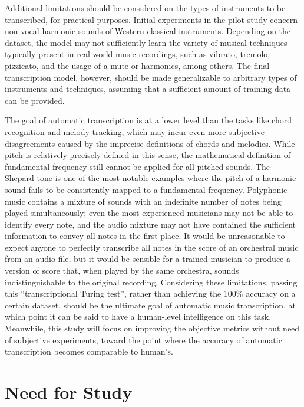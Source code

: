 Additional limitations should be considered on the types of instruments to be transcribed, for practical purposes.
Initial experiments in the pilot study concern non-vocal harmonic sounds of Western classical instruments.
Depending on the dataset, the model may not sufficiently learn the variety of musical techniques typically present in real-world music recordings, such as vibrato, tremolo, pizzicato, and the usage of a mute or harmonics, among others.
The final transcription model, however, should be made generalizable to arbitrary types of instruments and techniques, assuming that a sufficient amount of training data can be provided.


The goal of automatic transcription is at a lower level than the tasks like chord recognition and melody tracking, which may incur even more subjective disagreements caused by the imprecise definitions of chords and melodies.
While pitch is relatively precisely defined in this sense, the mathematical definition of fundamental frequency still cannot be applied for all pitched sounds.
The Shepard tone \cite{shepard1964circularity} is one of the most notable examples where the pitch of a harmonic sound fails to be consistently mapped to a fundamental frequency.
Polyphonic music contains a mixture of sounds with an indefinite number of notes being played simultaneously; even the most experienced musicians may not be able to identify every note, and the audio mixture may not have contained the sufficient information to convey all notes in the first place.
It would be unreasonable to expect anyone to perfectly transcribe all notes in the score of an orchestral music from an audio file, but it would be sensible for a trained musician to produce a version of score that, when played by the same orchestra, sounds indistinguishable to the original recording.
Considering these limitations, passing this ``transcriptional Turing test'', rather than achieving the 100\% accuracy on a certain dataset, should be the ultimate goal of automatic music transcription, at which point it can be said to have a human-level intelligence on this task.
Meanwhile, this study will focus on improving the objective metrics without need of subjective experiments, toward the point where the accuracy of automatic transcription becomes comparable to human's.



\section{Need for Study}

